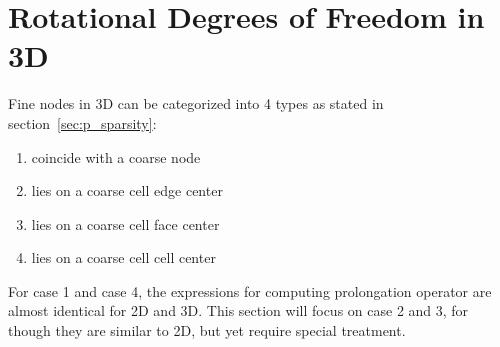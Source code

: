 \section{Rotational Degrees of Freedom in 3D}
Fine nodes in 3D can be categorized into 4 types as stated in section~\ref{sec:p_sparsity}:
\begin{enumerate}
\item coincide with a coarse node
\item lies on a coarse cell edge center
\item lies on a coarse cell face center
\item lies on a coarse cell cell center
\end{enumerate}
For case 1 and case 4, the expressions for computing prolongation operator are almost identical for 2D and 3D. This section will focus on case 2 and 3, for though they are similar to 2D, but yet require special treatment. 
